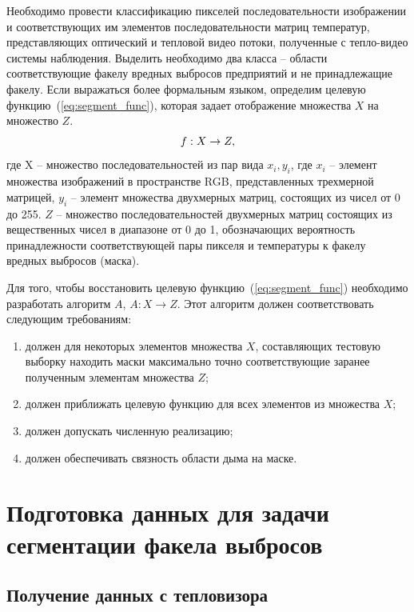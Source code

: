 \documentclass[14pt, a4paper]{extreport}
\begin{document}
	Необходимо провести классификацию пикселей последовательности изображении и соответствующих им элементов последовательности матриц температур, представляющих оптический и тепловой видео потоки, полученные с тепло-видео системы наблюдения. Выделить необходимо два класса -- области соответствующие факелу вредных выбросов предприятий и не принадлежащие факелу. Если выражаться более формальным языком, определим целевую функцию~(\ref{eq:segment_func}), которая задает отображение множества $X$ на множество $Z$.
	\vspace*{-0.2cm}
	\begin{equation}
		f: X \rightarrow Z,
		\label{eq:segment_func}
		\vspace*{-0.4cm}
	\end{equation}
	где X -- множество последовательностей из пар вида $x_i, y_i$, где $x_i$ -- элемент множества изображений в пространстве RGB, представленных трехмерной матрицей, $y_i$ -- элемент множества двухмерных матриц, состоящих из чисел от 0 до 255. $Z$ -- множество последовательностей двухмерных матриц состоящих из вещественных чисел в диапазоне от 0 до 1, обозначающих вероятность принадлежности соответствующей пары пикселя и температуры к факелу вредных выбросов (маска).
	
	Для того, чтобы восстановить целевую функцию~(\ref{eq:segment_func}) необходимо разработать алгоритм $A$, $A: X \rightarrow Z$. Этот алгоритм должен соответствовать следующим требованиям:
	\begin{enumerate}[label={\arabic*)}]
		\item должен для некоторых элементов множества $X$, составляющих тестовую выборку находить маски максимально точно соответствующие заранее полученным элементам множества $Z$;
		\item должен приближать целевую функцию для всех элементов из множества $X$;
		\item должен допускать численную реализацию;
		\item должен обеспечивать связность области дыма на маске.
	\end{enumerate}
	
	\section{Подготовка данных для задачи сегментации факела выбросов}
	\subsection{Получение данных с тепловизора}
	
\end{document}
